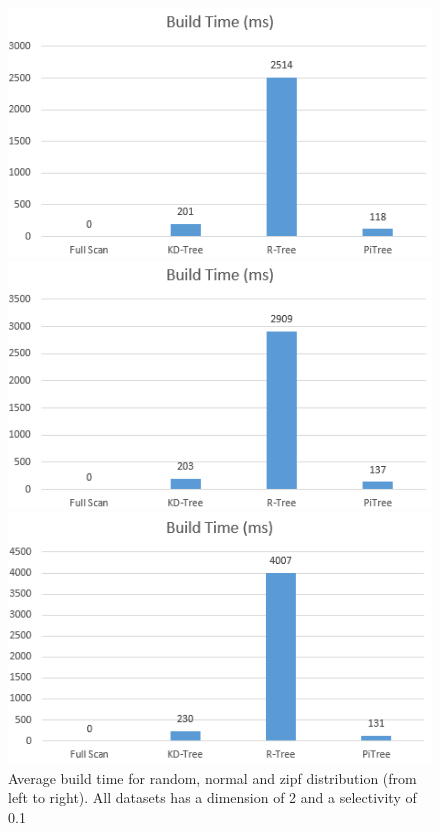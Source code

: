 \documentclass[sigconf,10pt]{acmart}
\begin{document}
\begin{figure}[t] 
  \label{overall-performance-btime} 
  \begin{minipage}[b]{0.33\linewidth}
    \centering
    \includegraphics[width=.8\linewidth]{../figures/overall-performance/random-btime} 
    \vspace{4ex}
  \end{minipage}%
  \begin{minipage}[b]{0.33\linewidth}
    \centering
    \includegraphics[width=.8\linewidth]{../figures/overall-performance/normal-btime} 
    \vspace{4ex}
  \end{minipage}%
  \begin{minipage}[b]{0.33\linewidth}
    \centering
    \includegraphics[width=.8\linewidth]{../figures/overall-performance/zipf-btime} 
    \vspace{4ex}
  \end{minipage}
  \caption{Average build time for random, normal and zipf distribution (from left to right). 
  All datasets has a dimension of 2 and a selectivity of 0.1}
\end{figure}
\end{document}
